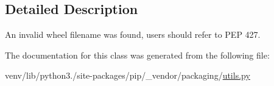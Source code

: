 \subsection{Detailed Description}
\begin{DoxyVerb}An invalid wheel filename was found, users should refer to PEP 427.
\end{DoxyVerb}
 

The documentation for this class was generated from the following file\+:\begin{DoxyCompactItemize}
\item 
venv/lib/python3./site-\/packages/pip/\+\_\+vendor/packaging/\hyperlink{pip_2__vendor_2packaging_2utils_8py}{utils.\+py}\end{DoxyCompactItemize}
